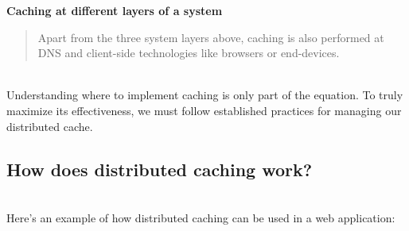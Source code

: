 \textbf{Caching at different layers of a system}

\begin{table}[htbp]
\centering
\small
{}
\caption{Caching at different layers of a system}
\end{table}

\begin{quote}
Apart from the three system layers above, caching is also performed at DNS and client-side technologies like browsers or end-devices.
\end{quote}
\\
Understanding where to implement caching is only part of the equation. To truly maximize its effectiveness, we must follow established practices for managing our distributed cache.

\subsection{How does distributed caching work?}\label{f5p7m0bUaF5YMDZIxbUcM}
\\
Here's an example of how distributed caching can be used in a web application:


